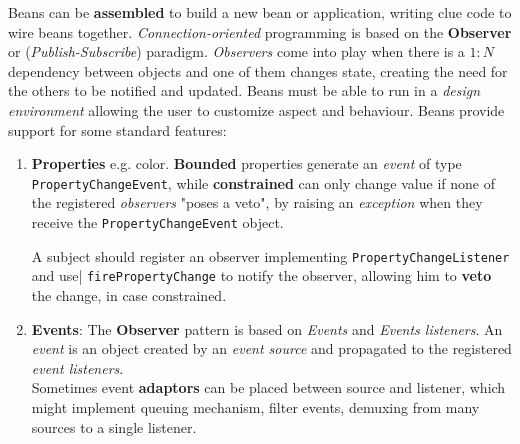 Beans can be \textbf{assembled} to build a new bean or application, writing clue code to wire beans together.
\textit{Connection-oriented} programming is based on the \textbf{Observer} or (\textit{Publish-Subscribe}) paradigm.
\textit{Observers} come into play when there is a $1:N$ dependency between objects and one of them changes state, creating the need for the others to be notified and updated.
Beans must be able to run in a \textit{design environment} allowing the user to customize aspect and behaviour.
Beans provide support for some standard features:
\begin{enumerate}
    \item \textbf{Properties} e.g. color. 
    \textbf{Bounded} properties generate an \textit{event} of type \lstinline{PropertyChangeEvent},
    while \textbf{constrained} can only change value if none of the registered \textit{observers} "poses a veto",
    by raising an \textit{exception} when they receive the \lstinline{PropertyChangeEvent} object.

    A subject should register an observer implementing \lstinline|PropertyChangeListener| and use| \lstinline|firePropertyChange| to notify the observer, allowing him to \textbf{veto} the change, in case constrained.
    \item \textbf{Events}: The \textbf{Observer} pattern is based on \textit{Events} and \textit{Events listeners}.
    An \textit{event} is an object created by an \textit{event source} and propagated to the registered \textit{event listeners}.\\
    Sometimes event \textbf{adaptors} can be placed between source and listener, 
    which might implement queuing mechanism, filter events, demuxing from many sources to a single listener.


\end{enumerate}
